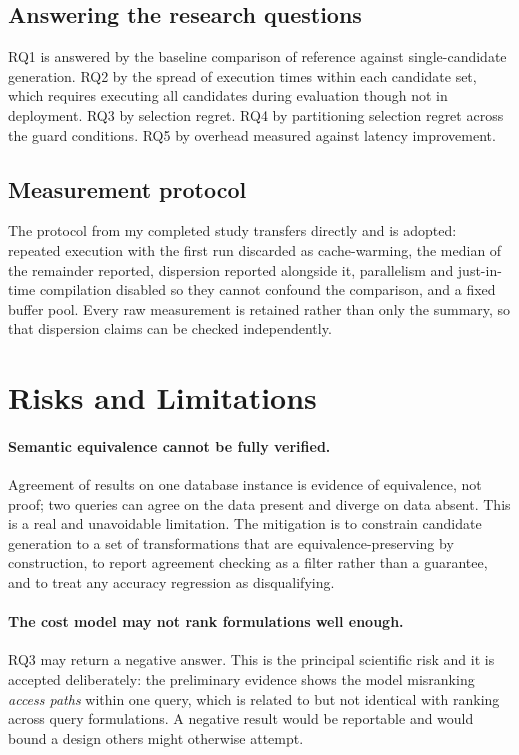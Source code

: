 \documentclass[12pt, a4paper]{article}
\begin{document}
\subsection{Answering the research questions}

RQ1 is answered by the baseline comparison of reference against
single-candidate generation. RQ2 by the spread of execution times within
each candidate set, which requires executing all candidates during
evaluation though not in deployment. RQ3 by selection regret. RQ4 by
partitioning selection regret across the guard conditions. RQ5 by
overhead measured against latency improvement.

\subsection{Measurement protocol}

The protocol from my completed study transfers directly and is adopted:
repeated execution with the first run discarded as cache-warming, the
median of the remainder reported, dispersion reported alongside it,
parallelism and just-in-time compilation disabled so they cannot
confound the comparison, and a fixed buffer pool. Every raw measurement
is retained rather than only the summary, so that dispersion claims can
be checked independently.

\section{Risks and Limitations}
\label{sec:risks}

\paragraph{Semantic equivalence cannot be fully verified.}
Agreement of results on one database instance is evidence of
equivalence, not proof; two queries can agree on the data present and
diverge on data absent. This is a real and unavoidable limitation. The
mitigation is to constrain candidate generation to a set of
transformations that are equivalence-preserving by construction, to
report agreement checking as a filter rather than a guarantee, and to
treat any accuracy regression as disqualifying.

\paragraph{The cost model may not rank formulations well enough.}
RQ3 may return a negative answer. This is the principal scientific risk
and it is accepted deliberately: the preliminary evidence shows the
model misranking \emph{access paths} within one query, which is related
to but not identical with ranking across query formulations. A negative
result would be reportable and would bound a design others might
otherwise attempt.
\end{document}
